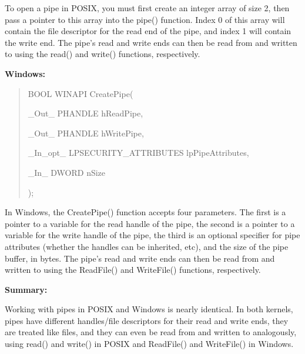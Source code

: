 \documentclass[letterpaper,10pt,titlepage]{article}
\newcommand{\tab}{\hspace*{2em}} %
\begin{document}
\begin{enumerate}
To open a pipe in POSIX, you must first create an integer array of size 2, then pass a pointer to this array into the pipe() function. Index 0 of this array will contain the file descriptor for the read end of the pipe, and index 1 will contain the write end. The pipe's read and write ends can then be read from and written to using the read() and write() functions, respectively.  \newline

\textbf{Windows:} 

\begin{quote}
BOOL WINAPI CreatePipe(

\tab\_Out\_     PHANDLE hReadPipe,

\tab\_Out\_     PHANDLE hWritePipe,

\tab\_In\_opt\_  LPSECURITY\_ATTRIBUTES lpPipeAttributes,

\tab\_In\_      DWORD nSize

);
\end{quote}

\tab In Windows, the CreatePipe() function accepts four parameters. The first is a pointer to a variable for the read handle of the pipe, the second is a pointer to a variable for the write handle of the pipe, the third is an optional specifier for pipe attributes (whether the handles can be inherited, etc), and the size of the pipe buffer, in bytes. The pipe's read and write ends can then be read from and written to using the ReadFile() and WriteFile() functions, respectively.

\textbf{Summary:} \newline

\tab Working with pipes in POSIX and Windows is nearly identical. In both kernels, pipes have different handles/file descriptors for their read and write ends, they are treated like files, and they can even be read from and written to analogously, using read() and write() in POSIX and ReadFile() and WriteFile() in Windows.

\end{enumerate}

%
\end{document}
